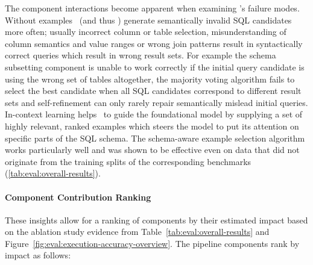 The component interactions become apparent when examining \Natural's failure
modes. Without examples \Natural~(and thus \OmniSQL) generate semantically
invalid SQL candidates more often; usually incorrect column or table selection,
misunderstanding of column semantics and value ranges or wrong join patterns
result in syntactically correct queries which result in wrong result sets. For
example the schema subsetting component is unable to work correctly if the
initial query candidate is using the wrong set of tables altogether, the
majority voting algorithm fails to select the best candidate when all SQL
candidates correspond to different result sets and self-refinement can only
rarely repair semantically mislead initial queries. In-context learning helps
\Natural~to guide the foundational model by supplying a set of highly relevant,
ranked examples which steers the model to put its attention on specific parts
of the SQL schema. The schema-aware example selection algorithm works
particularly well and was shown to be effective even on data that did not
originate from the training splits of the corresponding benchmarks
(\ref{tab:eval:overall-results}). 

\paragraph{Component Contribution Ranking}

These insights allow for a ranking of components by their estimated impact
based on the ablation study evidence from Table~\ref{tab:eval:overall-results}
and Figure~\ref{fig:eval:execution-accuracy-overview}. The pipeline components
rank by impact as follows:

